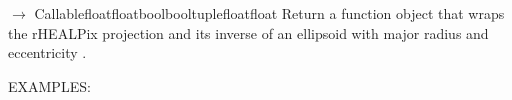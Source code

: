 \documentclass[a4paper,12ptopenany,oneside,english]{sphinxmanual}
\begin{document}
\begin{fulllineitems}
\label{\detokenize{pj_rhealpix:rhealpixdggs.pj_rhealpix.rhealpix}}
\pysigstartsignatures
\pysiglinewithargsret
{}
{\sphinxparamcomma {}\sphinxparamcomma {}\sphinxparamcomma {}\sphinxparamcomma {}}
{{ $\rightarrow$ Callable\DUrole{p}{{[}}\DUrole{p}{{[}}floatfloatboolbool\DUrole{p}{{]}}tuple\DUrole{p}{{[}}floatfloat\DUrole{p}{{]}}\DUrole{p}{{]}}}}
\pysigstopsignatures
\sphinxAtStartPar
Return a function object that wraps the rHEALPix projection and its inverse
of an ellipsoid with major radius  and eccentricity .

\sphinxAtStartPar
EXAMPLES:


\end{fulllineitems}
\end{document}
